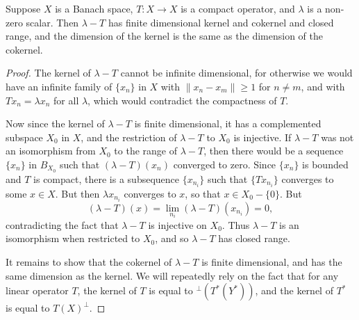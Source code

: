 \begin{theorem}
    Suppose $X$ is a Banach space, $T: X \to X$ is a compact operator, and $\lambda$ is a non-zero scalar. Then $\lambda - T$ has finite dimensional kernel and cokernel and closed range, and the dimension of the kernel is the same as the dimension of the cokernel.
\end{theorem}
\begin{proof}
    The kernel of $\lambda - T$ cannot be infinite dimensional, for otherwise we would have an infinite family of $\{ x_n \}$ in $X$ with $\| x_n - x_m \| \geq 1$ for $n \neq m$, and with $Tx_n = \lambda x_n$ for all $\lambda$, which would contradict the compactness of $T$.

    Now since the kernel of $\lambda - T$ is finite dimensional, it has a complemented subspace $X_0$ in $X$, and the restriction of $\lambda - T$ to $X_0$ is injective. If $\lambda - T$ was not an isomorphism from $X_0$ to the range of $\lambda - T$, then there would be a sequence $\{ x_n \}$ in $B_{X_0}$ such that $(\lambda - T)(x_n)$ converged to zero. Since $\{ x_n \}$ is bounded and $T$ is compact, there is a subsequence $\{ x_{n_i} \}$ such that $\{ Tx_{n_i} \}$ converges to some $x \in X$. But then $\lambda x_{n_i}$ converges to $x$, so that $x \in X_0 - \{ 0 \}$. But
    \[ (\lambda - T)(x) = \lim_{n_i} (\lambda - T)(x_{n_i}) = 0, \]
    contradicting the fact that $\lambda - T$ is injective on $X_0$. Thus $\lambda - T$ is an isomorphism when restricted to $X_0$, and so $\lambda - T$ has closed range.

    It remains to show that the cokernel of $\lambda - T$ is finite dimensional, and has the same dimension as the kernel. We will repeatedly rely on the fact that for any linear operator $T$, the kernel of $T$ is equal to ${}^\perp (T^*(Y^*))$, and the kernel of $T^*$ is equal to $T(X)^\perp$.


\end{proof}
